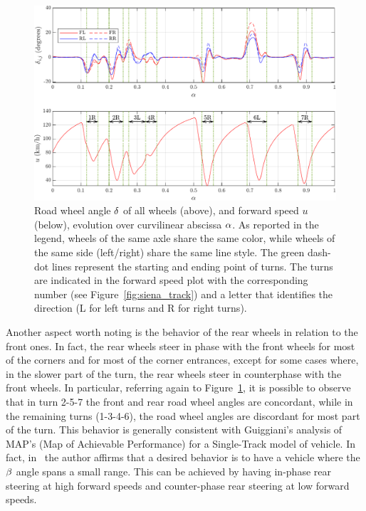 \begin{figure}[h]
	\centering
	\includegraphics[scale = .8]{Images/DrivingStyles/RWD_AS_toes.pdf}
	\caption{Road wheel angle $\delta$ of all wheels (above), and forward speed $u$ (below), evolution over curvilinear abscissa $\alpha$. As reported in the legend, wheels of the same axle share the same color, while wheels of the same side (left/right) share the same line style. The green dash-dot lines represent the starting and ending point of turns. The turns are indicated in the forward speed plot with the corresponding number (see Figure~\ref{fig:siena_track}) and a letter that identifies the direction (L for left turns and R for right turns).}
	\label{fig:RWD_AS_toes}
\end{figure}

Another aspect worth noting is the behavior of the rear wheels in relation to the front ones. In fact, the rear wheels steer in phase with the front wheels for most of the corners and for most of the corner entrances, except for some cases where, in the slower part of the turn, the rear wheels steer in counterphase with the front wheels.
In particular, referring again to Figure~\ref{fig:RWD_AS_toes}, it is possible to observe that in turn 2-5-7 the front and rear road wheel angles are concordant, while in the remaining turns (1-3-4-6), the road wheel angles are discordant for most part of the turn.
This behavior is generally consistent with Guiggiani's analysis of MAP's (Map of Achievable Performance) for a Single-Track model of vehicle. In fact, in~\cite[Section~6.8.1]{Guiggiani:book:2023} the author affirms that a desired behavior is to have a vehicle where the $\beta$ angle spans a small range.
This can be achieved by having in-phase rear steering at high forward speeds and counter-phase rear steering at low forward speeds.


